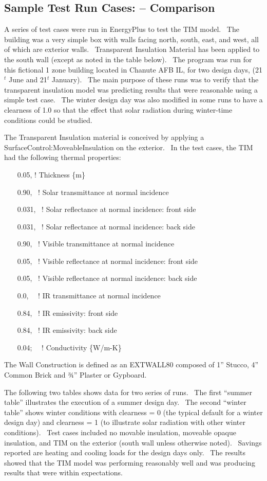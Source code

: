 \subsection{Sample Test Run Cases: -- Comparison}\label{sample-test-run-cases-comparison}

A series of test cases were run in EnergyPlus to test the TIM model.~ The building was a very simple box with walls facing north, south, east, and west, all of which are exterior walls.~ Transparent Insulation Material has been applied to the south wall (except as noted in the table below).~ The program was run for this fictional 1 zone building located in Chanute AFB IL, for two design days, (21\(^{t}\) June and 21\(^{t}\) January).~ The main purpose of these runs was to verify that the transparent insulation model was predicting results that were reasonable using a simple test case.~ The winter design day was also modified in some runs to have a clearness of 1.0 so that the effect that solar radiation during winter-time conditions could be studied.

The Transparent Insulation material is conceived by applying a SurfaceControl:MoveableInsulation on the exterior.~ In the test cases, the TIM had the following thermal properties:

~~~ 0.05, ! Thickness \{m\}

~~~ 0.90,~ ! Solar transmittance at normal incidence

~~~ 0.031,~ ! Solar reflectance at normal incidence: front side

~~~ 0.031,~ ! Solar reflectance at normal incidence: back side

~~~ 0.90,~ ! Visible transmittance at normal incidence

~~~ 0.05,~ ! Visible reflectance at normal incidence: front side

~~~ 0.05,~ ! Visible reflectance at normal incidence: back side

~~~ 0.0,~~ ! IR transmittance at normal incidence

~~~ 0.84,~ ! IR emissivity: front side

~~~ 0.84,~ ! IR emissivity: back side

~~~ 0.04;~~ ! Conductivity \{W/m-K\}

The Wall Construction is defined as an EXTWALL80 composed of 1'' Stucco, 4'' Common Brick and ¾'' Plaster or Gypboard.

The following two tables shows data for two series of runs.~ The first ``summer table'' illustrates the execution of a summer design day.~ The second ``winter table'' shows winter conditions with clearness = 0 (the typical default for a winter design day) and clearness = 1 (to illustrate solar radiation with other winter conditions).~ Test cases included no movable insulation, moveable opaque insulation, and TIM on the exterior (south wall unless otherwise noted).~ Savings reported are heating and cooling loads for the design days only.~ The results showed that the TIM model was performing reasonably well and was producing results that were within expectations.

